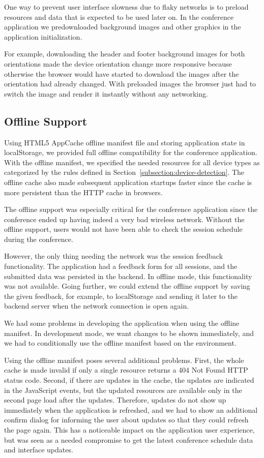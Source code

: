 One way to prevent user interface slowness due to flaky networks is to
preload resources and data that is expected to be used later on. In
the conference application we predownloaded background images and
other graphics in the application initialization.

For example, downloading the header and footer background images for
both orientations made the device orientation change more responsive
because otherwise the browser would have started to download the
images after the orientation had already changed. With preloaded
images the browser just had to switch the image and render it
instantly without any networking.

\subsection{Offline Support}

Using HTML5 AppCache offline manifest file and storing application
state in localStorage, we provided full offline compatibility for the
conference application. With the offline manifest, we specified the
needed resources for all device types as categorized by the rules
defined in Section~\ref{subsection:device-detection}. The offline
cache also made subsequent application startups faster since the cache
is more persistent than the HTTP cache in browsers.

The offline support was especially critical for the conference
application since the conference ended up having indeed a very bad
wireless network.  Without the offline support, users would not have
been able to check the session schedule during the conference.

However, the only thing needing the network was the session feedback
functionality. The application had a feedback form for all sessions,
and the submitted data was persisted in the backend. In offline mode,
this functionality was not available. Going further, we could extend
the offline support by saving the given feedback, for example, to
localStorage and sending it later to the backend server when the
network connection is open again.

We had some problems in developing the application when using the
offline manifest. In development mode, we want changes to be shown
immediately, and we had to conditionally use the offline manifest
based on the environment.

Using the offline manifest poses several additional problems. First,
the whole cache is made invalid if only a single resource returns a
404 Not Found HTTP status code. Second, if there are updates in the
cache, the updates are indicated in the JavaScript events, but the
updated resources are available only in the second page load after the
updates. Therefore, updates do not show up immediately when the
application is refreshed, and we had to show an additional confirm
dialog for informing the user about updates so that they could refresh
the page again. This has a noticeable impact on the application user
experience, but was seen as a needed compromise to get the latest
conference schedule data and interface updates.

